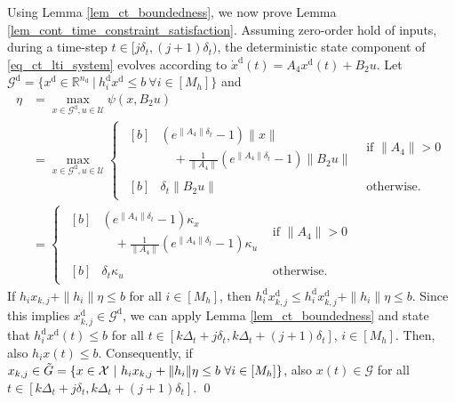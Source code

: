 \documentclass{IEEEtran}
\begin{document}
\begin{appendices}
Using Lemma \ref{lem_ct_boundedness}, we now prove Lemma \ref{lem_cont_time_constraint_satisfaction}. Assuming zero-order hold of inputs, during a time-step $t\in[j\delta_t,(j+1)\delta_t)$, the deterministic state component of \eqref{eq_ct_lti_system} evolves according to $\dot x^{\text{d}}(t) = A_4x^{\text{d}}(t)+B_2u$. Let $\mathcal{G}^{\text{d}}=\{x^{\text{d}}\in\mathbb{R}^{n_{\text{d}}}\ | \ h_i^{\text{d}}x^{\text{d}}\leq b \ \forall i\in[M_h]\}$ and 
\begin{align*}
    \eta &= \max_{x\in\mathcal{G}^{\text{d}}, u\in\mathcal{U}}\psi(x,B_2u)\\ &=\max_{x\in\mathcal{G}^{\text{d}}, u\in\mathcal{U}}\begin{cases}
            \begin{aligned}[b]
            &(e^{\|A_4\|\delta_t}-1)\|x\| \\
            &\quad\!+\!\frac{1}{\|A_4\|}(e^{\|A_4\|\delta_t}\!-\!1)\|B_2u\|
            \end{aligned}
            &\text{if } \|A_4\|\!>\!0 \\
            \begin{aligned}[b]
            &\delta_t \|B_2u\|
            \end{aligned}
            &\text{otherwise.}
        \end{cases} \\
        &=\begin{cases}
            \begin{aligned}[b]
            &(e^{\|A_4\|\delta_t}-1)\kappa_x \\
            &\quad\!+\!\frac{1}{\|A_4\|}(e^{\|A_4\|\delta_t}\!-\!1)\kappa_u
            \end{aligned}
            &\text{if } \|A_4\|\!>\!0 \\
            \begin{aligned}[b]
            &\delta_t \kappa_u
            \end{aligned}
            &\text{otherwise.}
        \end{cases} 
\end{align*}
If $h_i{x}_{k,j} + \|h_i\|\eta\leq b$ for all $i\in[M_h]$, then $h_i^{\text{d}}{x}^{\text{d}}_{k,j} \leq h_i^{\text{d}}{x}^{\text{d}}_{k,j} + \|h_i\|\eta\leq b$. Since this implies ${x}_{k,j}^{\text{d}}\in\mathcal{G}^{\text{d}}$, we can apply Lemma \ref{lem_ct_boundedness} and state that $h_i^{\text{d}}{x}^{\text{d}}(t)\leq b$ for all $t\in[k\Delta_t+j\delta_t,k\Delta_t+(j+1)\delta_t]$, $i\in[M_h]$. Then, also $h_i{x}(t)\leq b$. Consequently, if $x_{k,j}\in\Tilde{G}=\{x\in\mathcal{X}\ | \ h_i{x}_{k,j}+ \|h_i\|{\eta} \leq b \ \forall i\in[M_h]\}$, also $x(t)\in\mathcal{G}$ for all $t\in[k\Delta_t+j\delta_t,k\Delta_t+(j+1)\delta_t]$. 
\qed


\end{appendices}
\end{document}
